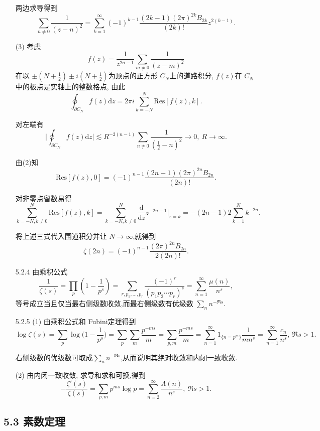 \begin{itemize}
两边求导得到
$$\sum_{n \ne 0} \frac{1}{(z-n)^2} 
= \sum_{k=1}^{\infty}(-1)^{k-1} \frac{(2k-1)(2 \pi)^{2k} B_{2k}}{(2k)!}z^{2(k-1)}.$$

(3) 考虑 $$f(z) =\frac{1}{z^{2n-1}}\sum_{m \ne 0} \frac{1}{(z-m)^2}$$ 
在以 $\pm (N+\frac{1}{2})\pm i(N+\frac{1}{2})$为顶点的正方形 $C_N$上的道路积分,
$f(z)$在 $C_N$中的极点是实轴上的整数格点, 由此
$$\oint_{\partial C_N} f(z)\mathrm{d}z 
= 2\pi i \sum_{k=-N}^{N} \text{Res}[f(z),k].$$

对左端有
$$\Big|\oint_{\partial C_N} f(z)\mathrm{d}z\Big|
\lesssim  R^{-2(n-1)}\sum_{n \ne 0}\frac{1}{(\frac{1}{2}-n)^2}\to 0,
\ R\to \infty.$$

由(2)知
$$\text{Res}[f(z),0] =(-1)^{n-1} \frac{(2n-1)(2 \pi)^{2n} B_{2n}}{(2n)!}. $$

对非零点留数易得
$$\sum_{k=-N, k \ne 0}^{N}\text{Res}[f(z),k] 
= \sum_{k=-N, k \ne 0}^{N} \frac{\mathrm{d}}{\mathrm{d}z}{z^{-2n+1}}\Big|_{z=k} 
= -(2n-1)2\sum_{k=1}^{N}k^{-2n}.$$

将上述三式代入围道积分并让  $N\to \infty$,就得到
$$\zeta(2n) = (-1)^{n-1} \frac{(2 \pi)^{2n} B_{2n}}{2(2n)!}.$$

    \item[5.2.4]由乘积公式
$$\frac{1}{\zeta(s)} = \prod_{p}\left( 1-\frac{1}{p^s}  \right) 
= \sum_{r,p_1, \ldots ,p_r} \frac{(-1)^r}{(p_1 p_2\cdots p_r)^s} 
= \sum_{n=1}^{\infty}\frac{\mu(n)}{n^s},$$
等号成立当且仅当最右侧级数收敛,而最右侧级数有优级数 $\sum_{n} n^{-\Re s}$.

    \item[5.2.5]    (1) 由乘积公式和 Fubini定理得到
$$\log \zeta(s)  = \sum_{p}\log \Big(1-\frac{1}{p^s}\Big) 
=  \sum_{p} \sum_{m} \frac{p^{-ms}}{m}=\sum_{p,m} \frac{p^{-ms}}{m} 
=  \sum_{n=1}^{\infty}1_{\{n=p^m\}} \frac{1}{m n^s} 
= \sum_{n=1}^\infty \frac{c_n}{n^s},\ \Re s>1. $$

右侧级数的优级数可取成$\sum_{n} n^{-\Re s}$,从而说明其绝对收敛和内闭一致收敛.

(2) 由内闭一致收敛, 求导和求和可换,得到
$$-\frac{\zeta'(s)}{\zeta(s)} = \sum_{p,m} p^{ms}\log p 
= \sum_{n=2}^\infty \frac{\Lambda(n)}{n^s},\ \Re s>1.$$
\end{itemize}

\subsection*{5.3 素数定理}


